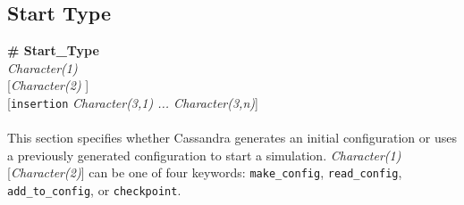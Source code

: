 %
%
%
%
%
%
\subsection{Start Type}\label{sec:Start_Type}
{\bf \# Start\_Type} \\
{\it Character(1) } \\
{[}{\it Character(2) }] \\
{[}{\tt insertion} {\it Character(3,1) ... Character(3,n)}] \\ \\
%
This section specifies whether Cassandra generates an initial configuration or
uses a previously generated configuration to start a simulation.
{\it Character(1)} [{\it Character(2)}] can be one of four keywords:
{\tt make\_config}, {\tt read\_config}, {\tt add\_to\_config}, or {\tt checkpoint}.

